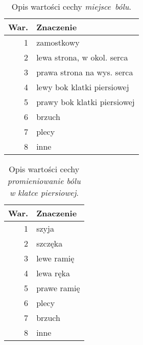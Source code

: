 \begin{multicols}{2}
    \begin{wraptable}{c}{\linewidth}
        \caption{Opis wartości cechy \textit{miejsce~bólu}.}\label{tab:cecha_3}
        \begin{tabu}{rX[l]}
            \toprule
            \textbf{War.} & \textbf{Znaczenie}          \\
            \midrule

            1             & zamostkowy                  \\
            2             & lewa strona, w okol. serca  \\
            3             & prawa strona na wys. serca  \\
            4             & lewy bok klatki piersiowej  \\
            5             & prawy bok klatki piersiowej \\
            6             & brzuch                      \\
            7             & plecy                       \\
            8             & inne                        \\
            \bottomrule
        \end{tabu}
    \end{wraptable}

    \begin{wraptable}{c}{\linewidth}
        \caption{Opis wartości cechy \textit{promieniowanie bólu w klatce piersiowej}.}\label{tab:cecha_4}
        \begin{tabu}{rX[l]}
            \toprule
            \textbf{War.} & \textbf{Znaczenie} \\
            \midrule

            1             & szyja              \\
            2             & szczęka            \\
            3             & lewe ramię         \\
            4             & lewa ręka          \\
            5             & prawe ramię        \\
            6             & plecy              \\
            7             & brzuch             \\
            8             & inne               \\
            \bottomrule
        \end{tabu}
    \end{wraptable}


\end{multicols}
